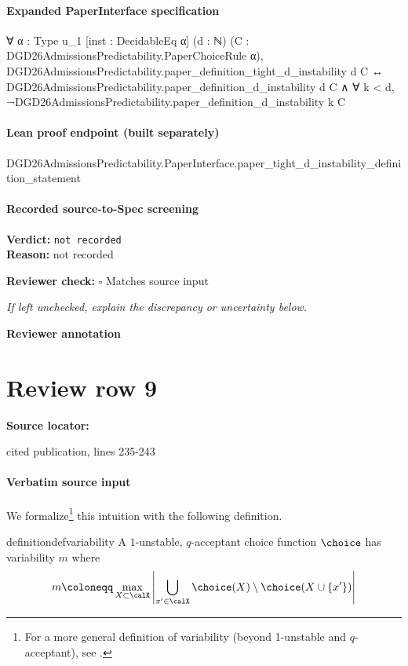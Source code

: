 \documentclass[10pt]{article}
\newcommand{\reviewerbox}{%
  \par\noindent\fbox{\parbox{0.96\linewidth}{\rule{0pt}{0.38in}}}\par
}
\newcommand{\reviewmatch}[1]{%
  \par\noindent\textbf{Reviewer check:} $\square$\; #1\par
  \noindent\emph{If left unchecked, explain the discrepancy or uncertainty below.}\par
}
\begin{document}
\paragraph{Expanded PaperInterface specification}
\begin{ReviewVerbatim}
∀ {α : Type u_1} [inst : DecidableEq α] (d : ℕ) (C : DGD26AdmissionsPredictability.PaperChoiceRule α),
  DGD26AdmissionsPredictability.paper_definition_tight_d_instability d C ↔
    DGD26AdmissionsPredictability.paper_definition_d_instability d C ∧
      ∀ k < d, ¬DGD26AdmissionsPredictability.paper_definition_d_instability k C
\end{ReviewVerbatim}

\paragraph{Lean proof endpoint (built separately)}\begin{ReviewVerbatim}
DGD26AdmissionsPredictability.PaperInterface.paper_tight_d_instability_definition_statement
\end{ReviewVerbatim}

\paragraph{Recorded source-to-Spec screening}
\textbf{Verdict:} \texttt{not recorded}
\\
\textbf{Reason:} not recorded
\reviewmatch{Matches source input}
\noindent\textbf{Reviewer annotation}\par
\reviewerbox
\clearpage
\hypertarget{source-claim-be4f0b5bb7e1dd6b}{}
\section*{Review row 9}
\textbf{Source locator:} {\footnotesize\raggedright cited publication, lines 235-\allowbreak{}243\par}
\paragraph{Verbatim source input}
\begin{ReviewVerbatim}
We formalize\footnote{For a more general definition of variability (beyond 1-unstable and $q$-acceptant), see .} this intuition with the following definition.

\begin{restatable}[Variability]{definition}{defvariability}
\label{def:variability}
A $1$-unstable, $q$-acceptant choice function $\choice$ has variability $m$ where
\begin{equation}
m \coloneqq \max_{X\subset \calX} \left|\bigcup\limits_{x'\in\calX} \choice(X) \setminus \choice(X \cup \{x'\})\right|
\end{equation}
\end{restatable}
\end{ReviewVerbatim}
\end{document}
